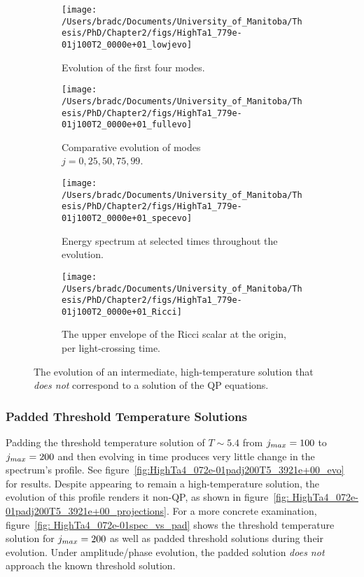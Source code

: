 \documentclass[../PhD.tex]{subfiles}
\begin{document}
\begin{figure}[h]
	\centering
	\begin{subfigure}[t]{0.45\textwidth}
		\texttt{[image: /Users/bradc/Documents/University\_of\_Manitoba/Thesis/PhD/Chapter2/figs/HighTa1\_779e-01j100T2\_0000e+01\_lowjevo]}
		\caption{Evolution of the first four modes.}
	\end{subfigure}
	\;
	\begin{subfigure}[t]{0.45\textwidth}
		\texttt{[image: /Users/bradc/Documents/University\_of\_Manitoba/Thesis/PhD/Chapter2/figs/HighTa1\_779e-01j100T2\_0000e+01\_fullevo]}
		\caption{Comparative evolution of modes\\ $j=0, 25, 50, 75, 99$.}
	\end{subfigure}
	\;
	\begin{subfigure}[t]{0.45\textwidth}
		\texttt{[image: /Users/bradc/Documents/University\_of\_Manitoba/Thesis/PhD/Chapter2/figs/HighTa1\_779e-01j100T2\_0000e+01\_specevo]}
		\caption{Energy spectrum at selected times throughout the evolution.}
	\end{subfigure}
	\;
	\begin{subfigure}[t]{0.45\textwidth}
		\texttt{[image: /Users/bradc/Documents/University\_of\_Manitoba/Thesis/PhD/Chapter2/figs/HighTa1\_779e-01j100T2\_0000e+01\_Ricci]}
		\caption{The upper envelope of the Ricci scalar at the origin, per light-crossing time.}
	\end{subfigure}
	\caption[Evolution of a high-temperature state that does not satisfy the QP equation]{The evolution of an intermediate, high-temperature solution that \emph{does not} correspond to a solution of the QP equations.}
	\label{fig:HighTa1_779e-01j100T2_0000e+01evo}
\end{figure}


\subsubsection{Padded Threshold Temperature Solutions}

Padding the threshold temperature solution of $T \sim 5.4$ from $j_{max} = 100$ to $j_{max} = 200$ and then evolving in time produces very little change in the spectrum's profile. See figure~\ref{fig:HighTa4_072e-01padj200T5_3921e+00_evo} for results. Despite appearing to remain a high-temperature solution, the evolution of this profile renders it non-QP, as shown in figure~\ref{fig: HighTa4_072e-01padj200T5_3921e+00_projections}. For a more concrete examination, figure~\ref{fig: HighTa4_072e-01spec_vs_pad} shows the threshold temperature solution for $j_{max} = 200$ as well as padded threshold solutions during their evolution. Under amplitude/phase evolution, the padded solution \emph{does not} approach the known threshold solution.
\end{document}
